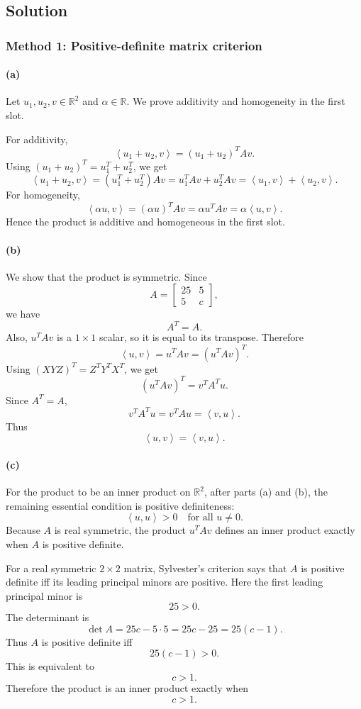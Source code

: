 \documentclass[12pt]{article}
\newcommand{\R}{\mathbb{R}}
\newcommand{\ip}[2]{\left\langle #1,#2\right\rangle}
\begin{document}
\subsection{Solution}


\subsubsection{Method 1: Positive-definite matrix criterion}

\paragraph{(a)}
Let $u_1,u_2,v\in\R^2$ and $\alpha\in\R$. We prove additivity and homogeneity in the first slot.

For additivity,
\[
\ip{u_1+u_2}{v}=(u_1+u_2)^TAv.
\]
Using $(u_1+u_2)^T=u_1^T+u_2^T$, we get
\[
\ip{u_1+u_2}{v}
=(u_1^T+u_2^T)Av
=u_1^TAv+u_2^TAv
=\ip{u_1}{v}+\ip{u_2}{v}.
\]
For homogeneity,
\[
\ip{\alpha u}{v}=(\alpha u)^TAv
=\alpha u^TAv
=\alpha\ip{u}{v}.
\]
Hence the product is additive and homogeneous in the first slot.

\paragraph{(b)}
We show that the product is symmetric. Since
\[
A=\begin{bmatrix}25&5\\5&c\end{bmatrix},
\]
we have
\[
A^T=A.
\]
Also, $u^TAv$ is a $1\times1$ scalar, so it is equal to its transpose. Therefore
\[
\ip{u}{v}=u^TAv=(u^TAv)^T.
\]
Using $(XYZ)^T=Z^TY^TX^T$, we get
\[
(u^TAv)^T=v^TA^T u.
\]
Since $A^T=A$,
\[
v^TA^Tu=v^TAu=\ip{v}{u}.
\]
Thus
\[
\boxed{\ip{u}{v}=\ip{v}{u}.}
\]

\paragraph{(c)}
For the product to be an inner product on $\R^2$, after parts (a) and (b), the remaining essential condition is positive definiteness:
\[
\ip{u}{u}>0\quad\text{for all }u\neq0.
\]
Because $A$ is real symmetric, the product $u^TAv$ defines an inner product exactly when $A$ is positive definite.

For a real symmetric $2\times2$ matrix, Sylvester's criterion says that $A$ is positive definite iff its leading principal minors are positive. Here the first leading principal minor is
\[
25>0.
\]
The determinant is
\[
\det A=25c-5\cdot5=25c-25=25(c-1).
\]
Thus $A$ is positive definite iff
\[
25(c-1)>0.
\]
This is equivalent to
\[
c>1.
\]
Therefore the product is an inner product exactly when
\[
\boxed{c>1.}
\]
\end{document}
